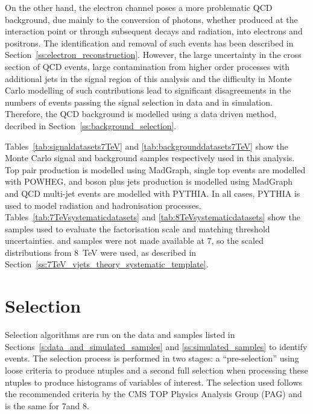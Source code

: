 On the other hand, the electron channel poses a more problematic QCD background, due mainly to the conversion
of photons, whether produced at the interaction point or through subsequent decays and radiation, into
electrons and positrons. The identification and removal of such events has been described in
Section~\ref{ss:electron_reconstruction}. However, the large uncertainty in the cross section of QCD events,
large contamination from higher order processes with additional jets in the signal region of this analysis and
the difficulty in Monte Carlo modelling of such contributions lead to significant disagreements in the numbers
of events passing the signal selection in data and in simulation. Therefore, the QCD background is
modelled using a data driven method, decribed in Section~\ref{ss:background_selection}.

Tables~\ref{tab:signaldatasets7TeV} and \ref{tab:backgrounddatasets7TeV} show the Monte Carlo signal and
background samples respectively used in this analysis. Top pair production is modelled using MadGraph, single
top events are modelled with POWHEG, \W and \Z boson plus jets production is modelled using MadGraph and QCD
multi-jet events are modelled with PYTHIA. In all cases, PYTHIA is used to model radiation and hadronisation
processes. Tables~\ref{tab:7TeVsystematicdatasets} and \ref{tab:8TeVsystematicdatasets} show the samples used
to evaluate the factorisation scale and matching threshold uncertainties. \WpJets and \ZpJets samples were not
made available at 7\TeV, so the scaled distributions from \SI{8}{\TeV} were used, as described in
Section~\ref{ss:7TeV_vjets_theory_systematic_template}.








\section{Selection}
\label{s:selection}
Selection algorithms are run on the data and samples listed in Sections~\ref{s:data_and_simulated_samples} and
\ref{ss:simulated_samples} to identify \ttbar events. The selection process is performed in two stages: a
``pre-selection'' using loose criteria to produce ntuples and a second full selection when processing these
ntuples to produce histograms of variables of interest. The selection used follows the recommended criteria by
the CMS TOP Physics Analysis Group (PAG) and is the same for 7\TeV and 8\TeV.

